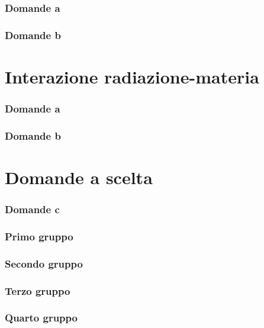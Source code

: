 \documentclass[10pt,a4paper]{article}
\begin{document}
\section{Domande a}
\section{Domande b}


\part{Interazione radiazione-materia}
\setcounter{section}{0}
\renewcommand*{\theHsection}{chX.\the\value{section}}
\section{Domande a}
\section{Domande b}

\part{Domande a scelta}

\setcounter{section}{2}
\renewcommand*{\theHsection}{chX.\the\value{section}}
\section{Domande c}%

\section*{Primo gruppo}%
\setcounter{subsection}{0}
 

\setcounter{section}{2}
\renewcommand*{\theHsection}{chX.\the\value{section}}

\section*{Secondo gruppo}%
\setcounter{subsection}{1}
 
\setcounter{section}{2}
\renewcommand*{\theHsection}{chX.\the\value{section}}

\section*{Terzo gruppo}%
\setcounter{subsection}{2}
 

\setcounter{section}{2}
\renewcommand*{\theHsection}{chX.\the\value{section}}

\section*{Quarto gruppo}%
\setcounter{subsection}{3}
 
\end{document}
